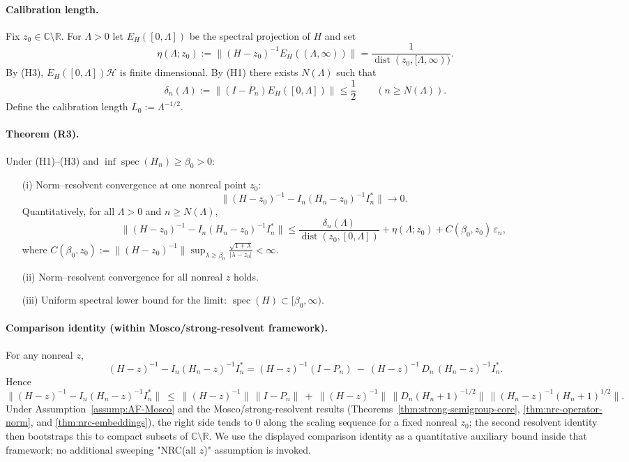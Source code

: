 \documentclass[11pt]{amsart}
\theoremstyle{plain}
\theoremstyle{definition}
\theoremstyle{remark}
\renewcommand{\tfrac}[2]{\textstyle\frac{#1}{#2}}
\begin{document}
\paragraph{Calibration length.}
Fix $z_0\in\mathbb C\setminus\mathbb R$. For $\Lambda>0$ let $E_H([0,\Lambda])$ be the spectral projection of $H$ and set
\[
  \eta(\Lambda;z_0):=\bigl\|(H-z_0)^{-1} E_H((\Lambda,\infty))\bigr\|=\frac{1}{\operatorname{dist}(z_0,[\Lambda,\infty))}.
\]
By (H3), $E_H([0,\Lambda])\mathcal H$ is finite dimensional. By (H1) there exists $N(\Lambda)$ such that
\[
  \delta_n(\Lambda):=\bigl\|(I-P_n) E_H([0,\Lambda])\bigr\|\le \tfrac12\qquad(n\ge N(\Lambda)).
\]
Define the calibration length $L_0:=\Lambda^{-1/2}$.

\paragraph{Theorem (R3).}
Under (H1)–(H3) and $\inf\operatorname{spec}(H_n)\ge \beta_0>0$:
\begin{itemize}
  \item[(i)] Norm–resolvent convergence at one nonreal point $z_0$:
  \[
    \bigl\|(H-z_0)^{-1} - I_n(H_n-z_0)^{-1} I_n^*\bigr\|\to 0.
  \]
  Quantitatively, for all $\Lambda>0$ and $n\ge N(\Lambda)$,
  \[
    \bigl\|(H-z_0)^{-1} - I_n(H_n-z_0)^{-1} I_n^*\bigr\|\le \frac{\delta_n(\Lambda)}{\operatorname{dist}(z_0,[0,\Lambda])}+\eta(\Lambda;z_0)+C(\beta_0,z_0)\,\varepsilon_n,
  \]
  where $C(\beta_0,z_0):=\bigl\|(H-z_0)^{-1}\bigr\|\sup_{\lambda\ge\beta_0} \frac{\sqrt{1+\lambda}}{|\lambda-z_0|}<\infty$.
  \item[(ii)] Norm–resolvent convergence for all nonreal $z$ holds.
  \item[(iii)] Uniform spectral lower bound for the limit: $\operatorname{spec}(H)\subset[\beta_0,\infty)$.
\end{itemize}

\paragraph{Comparison identity (within Mosco/strong-resolvent framework).}
For any nonreal $z$,
\[
  (H-z)^{-1} - I_n(H_n-z)^{-1} I_n^*= (H-z)^{-1}(I-P_n)\ -\ (H-z)^{-1}\, D_n\,(H_n-z)^{-1} I_n^*.
\]
Hence
\[
  \big\|(H-z)^{-1} - I_n(H_n-z)^{-1} I_n^*\big\|\ \le\ \|(H-z)^{-1}\|\,\|I-P_n\|\ +\ \|(H-z)^{-1}\|\,\|D_n(H_n+1)^{-1/2}\|\,\|(H_n-z)^{-1}(H_n+1)^{1/2}\|.
\]
Under Assumption~\ref{assump:AF-Mosco} and the Mosco/strong-resolvent results (Theorems~\ref{thm:strong-semigroup-core}, \ref{thm:nrc-operator-norm}, and \ref{thm:nrc-embeddings}), the right side tends to $0$ along the scaling sequence for a fixed nonreal $z_0$; the second resolvent identity then bootstraps this to compact subsets of $\mathbb C\setminus\mathbb R$. We use the displayed comparison identity as a quantitative auxiliary bound inside that framework; no additional sweeping "NRC(all $z$)" assumption is invoked.
\end{document}
